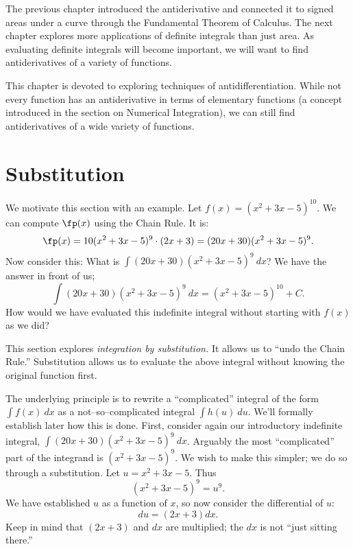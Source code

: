 %

The previous chapter introduced the antiderivative and connected it to signed areas under a curve through the Fundamental Theorem of Calculus. The next chapter explores more applications of definite integrals than just area. As evaluating definite integrals will become important, we will want to find antiderivatives of a variety of functions.

This chapter is devoted to exploring techniques of antidifferentiation. While not every function has an antiderivative in terms of elementary functions (a concept introduced in the section on Numerical Integration), we can still find antiderivatives of a wide variety of functions.


\section{Substitution}\label{sec:substitution}

We motivate this section with an example. Let $f(x) = (x^2+3x-5)^{10}$. We can compute $\fp(x)$ using the Chain Rule. It is:
	$$\fp(x) = 10(x^2+3x-5)^9\cdot(2x+3) = (20x+30)(x^2+3x-5)^9.$$
Now consider this: What is $\int (20x+30)(x^2+3x-5)^9\ dx$? We have the answer in front of us; $$\int (20x+30)(x^2+3x-5)^9\ dx = (x^2+3x-5)^{10}+C.$$
How would we have evaluated this indefinite integral without starting with $f(x)$ as we did?

This section explores \textit{integration by substitution.} It allows us to ``undo the Chain Rule.'' Substitution allows us to evaluate the above integral without knowing the original function first.

The underlying principle is to rewrite a ``complicated'' integral of the form $\int f(x)\ dx$ as a not--so--complicated integral $\int h(u)\ du$. We'll formally establish later how this is done. First, consider again our introductory indefinite integral, $\int (20x+30)(x^2+3x-5)^9\ dx$. Arguably the most ``complicated'' part of the integrand is $(x^2+3x-5)^9$. We wish to make this simpler; we do so through a substitution. Let $u=x^2+3x-5$. Thus $$(x^2+3x-5)^9 = u^9.$$
We have established $u$ as a function of $x$, so now consider the differential of $u$: $$du = (2x+3)dx.$$ Keep in mind that $(2x+3)$ and $dx$ are multiplied; the $dx$ is not ``just sitting there.''

